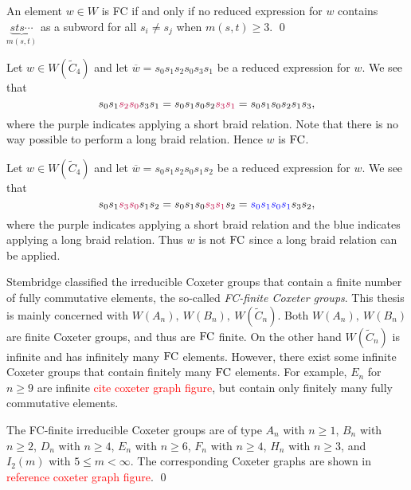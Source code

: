 \begin{theorem}
	An element $w \in W$ is FC if and only if no reduced expression for $w$ contains $\underbrace{sts\cdots}_{m(s,t)}$ as a subword for all $s_i \neq s_j$ when $m(s,t) \geq 3$. \qed
\end{theorem}

\begin{example}
	Let $w \in W(\widetilde{C}_4)$ and let $\overline{w}=s_0s_1s_2s_0s_3s_1$ be a reduced expression for $w$. We see that
	\[s_0s_1\textcolor{purple}{s_2s_0}s_3s_1=s_0s_1s_0s_2\textcolor{purple}{s_3s_1}=s_0s_1s_0s_2s_1s_3,\]
	where the purple indicates applying a short braid relation. Note that there is no way possible to perform a long braid relation. Hence $w$ is $\mathrm{FC}$.
\end{example}

\begin{example}
Let $w \in W(\widetilde{C}_4)$ and let $\overline{w}=s_0s_1s_2s_0s_1s_2$ be a reduced expression for $w$. We see that
\[s_0s_1\textcolor{purple}{s_3s_0}s_1s_2=s_0s_1s_0\textcolor{purple}{s_3s_1}s_2=\textcolor{blue}{s_0s_1s_0s_1}s_3s_2,\]
where the purple indicates applying a short braid relation and the blue indicates applying a long braid relation. Thus $w$ is not $\mathrm{FC}$ since a long braid relation can be applied.  	
\end{example}

Stembridge classified the irreducible Coxeter groups that contain a finite number of fully commutative elements, the so-called \emph{FC-finite Coxeter groups}. This thesis is mainly concerned with $W(A_n),~W(B_n),~W(\widetilde{C}_n)$. Both $W(A_n),~W(B_n)$ are finite Coxeter groups, and thus are $\mathrm{FC}$ finite. On the other hand $W(\widetilde{C}_n)$ is infinite and has infinitely many $\mathrm{FC}$ elements. However, there exist some infinite Coxeter groups that contain finitely many $\mathrm{FC}$ elements. For example, $E_n$ for $n \geq 9$ are infinite \textcolor{red}{cite coxeter graph figure}, but contain only finitely many fully commutative elements.

\begin{theorem}
\label{thm:FCfinite} The FC-finite irreducible Coxeter groups are of type $A_n$ with $n \geq 1$, $B_n$ with $n \geq 2$, $D_n$ with $n \geq 4$, $E_n$ with $n \geq 6$, $F_n$ with $n \geq 4$, $H_n$ with $n \geq 3$, and $I_2(m)$ with $5 \leq m < \infty$. The corresponding Coxeter graphs are shown in \textcolor{red}{reference coxeter graph figure}. \qed
\end{theorem}
  


